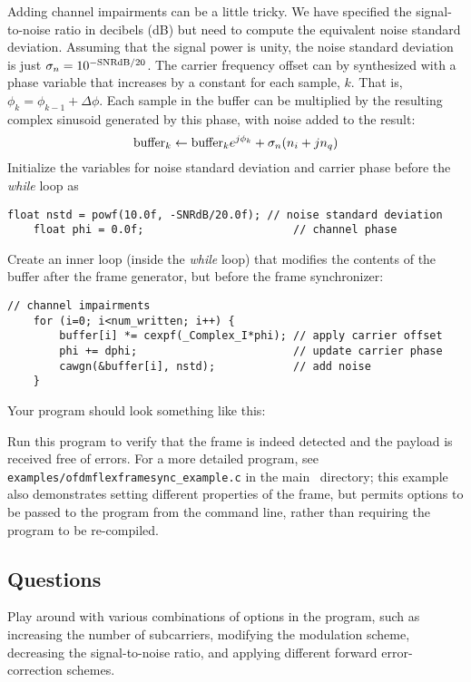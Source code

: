 Adding channel impairments can be a little tricky.
We have specified the signal-to-noise ratio in decibels (dB) but need to
compute the equivalent noise standard deviation.
Assuming that the signal power is unity, the noise standard deviation is
just $\sigma_n = 10^{-\textup{SNRdB}/20}$.
%
The carrier frequency offset can by synthesized with a phase variable
that increases by a constant for each sample, $k$.
That is, $\phi_{k} = \phi_{k-1} + \Delta\phi$.
Each sample in the buffer can be multiplied by the resulting complex
sinusoid generated by this phase, with noise added to the result:
\[
    \textup{buffer}_{k} \leftarrow \textup{buffer}_{k} e^{j\phi_{k}} + \sigma_n(n_i + jn_q)
\]
Initialize the variables for noise standard deviation and carrier phase
before the {\em while} loop as
%
\begin{Verbatim}[fontsize=\small]
    float nstd = powf(10.0f, -SNRdB/20.0f); // noise standard deviation
    float phi = 0.0f;                       // channel phase
\end{Verbatim}
%
Create an inner loop (inside the {\em while} loop) that modifies the
contents of the buffer after the frame generator, but before the frame
synchronizer:
%
\begin{Verbatim}[fontsize=\small]
    // channel impairments
    for (i=0; i<num_written; i++) {
        buffer[i] *= cexpf(_Complex_I*phi); // apply carrier offset
        phi += dphi;                        // update carrier phase
        cawgn(&buffer[i], nstd);            // add noise
    }
\end{Verbatim}
%
Your program should look something like this:
%

%
Run this program to verify that the frame is indeed detected
and the payload is received free of errors.
For a more detailed program, see
{\tt examples/ofdmflexframesync\_example.c}
in the main \liquid\ directory;
this example also demonstrates setting different properties of the
frame, but permits options to be passed to the program from the command
line, rather than requiring the program to be re-compiled.
%

%
%
\subsection{Questions}
\label{tutorial:ofdmflexframe:questions}

Play around with various combinations of options in the program, such as
increasing the number of subcarriers,
modifying the modulation scheme, decreasing the signal-to-noise ratio,
and applying different forward error-correction schemes.

